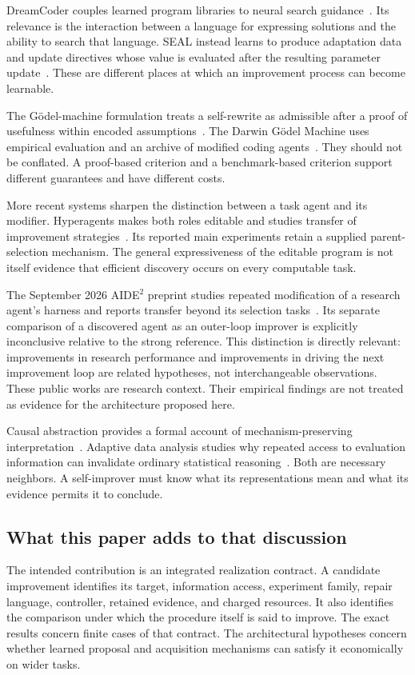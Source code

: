 \documentclass[11pt,letterpaper]{article}
\theoremstyle{plain}
\theoremstyle{definition}
\begin{document}
DreamCoder couples learned program libraries to neural search guidance~\cite{dreamcoder}. Its relevance is the interaction between a language for expressing solutions and the ability to search that language. SEAL instead learns to produce adaptation data and update directives whose value is evaluated after the resulting parameter update~\cite{seal}. These are different places at which an improvement process can become learnable.

The G\"odel-machine formulation treats a self-rewrite as admissible after a proof of usefulness within encoded assumptions~\cite{goedel}. The Darwin G\"odel Machine uses empirical evaluation and an archive of modified coding agents~\cite{dgm}. They should not be conflated. A proof-based criterion and a benchmark-based criterion support different guarantees and have different costs.

More recent systems sharpen the distinction between a task agent and its modifier. Hyperagents makes both roles editable and studies transfer of improvement strategies~\cite{hyperagents}. Its reported main experiments retain a supplied parent-selection mechanism. The general expressiveness of the editable program is not itself evidence that efficient discovery occurs on every computable task.

The September 2026 AIDE$^2$ preprint studies repeated modification of a research agent's harness and reports transfer beyond its selection tasks~\cite{aide}. Its separate comparison of a discovered agent as an outer-loop improver is explicitly inconclusive relative to the strong reference. This distinction is directly relevant: improvements in research performance and improvements in driving the next improvement loop are related hypotheses, not interchangeable observations. These public works are research context. Their empirical findings are not treated as evidence for the architecture proposed here.

Causal abstraction provides a formal account of mechanism-preserving interpretation~\cite{geiger}. Adaptive data analysis studies why repeated access to evaluation information can invalidate ordinary statistical reasoning~\cite{dwork}. Both are necessary neighbors. A self-improver must know what its representations mean and what its evidence permits it to conclude.

\subsection{What this paper adds to that discussion}
The intended contribution is an integrated realization contract. A candidate improvement identifies its target, information access, experiment family, repair language, controller, retained evidence, and charged resources. It also identifies the comparison under which the procedure itself is said to improve. The exact results concern finite cases of that contract. The architectural hypotheses concern whether learned proposal and acquisition mechanisms can satisfy it economically on wider tasks.
\end{document}
